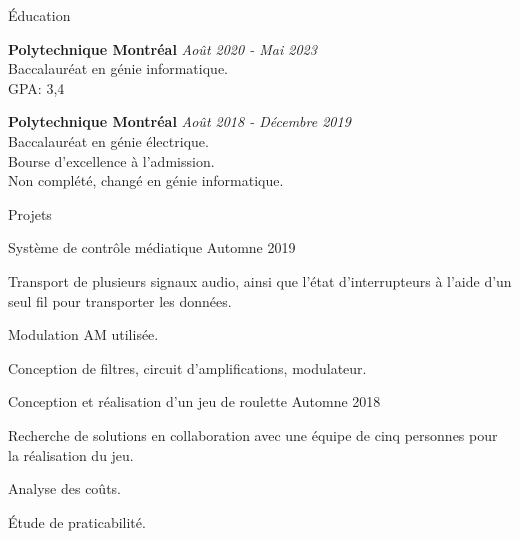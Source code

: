 \documentclass[french,12pt]{resume} %
\begin{document}
	

	\begin{rSection}{Éducation}
		
		{\bf Polytechnique Montréal} \hfill {\em Août 2020 - Mai 2023} 
		\\ Baccalauréat en génie informatique.
		\\  GPA: 3,4
		
		{\bf Polytechnique Montréal} \hfill {\em Août 2018 - Décembre 2019} 
		\\ Baccalauréat en génie électrique.
		\\   Bourse d'excellence à l'admission.
		\\		Non complété, changé en génie informatique.
	\end{rSection}
	
	\begin{rSection}{Projets}
		
		\begin{rSubsection}{Système de contrôle médiatique }{Automne 2019}{}{}
			\item   Transport de plusieurs signaux audio, ainsi que l'état d'interrupteurs à l'aide d'un seul fil pour transporter les données.
			\item   Modulation AM utilisée.
			\item Conception de filtres, circuit d'amplifications, modulateur.
			
		\end{rSubsection}
		
%			
		
		\begin{rSubsection}{Conception et réalisation d’un jeu de roulette }{Automne 2018}{}{}
			\item  Recherche de solutions en collaboration avec une équipe de cinq personnes pour la réalisation du jeu.
			\item  Analyse des coûts.
			\item  Étude de praticabilité.
		\end{rSubsection} 
		
	\end{rSection}
	
\end{document}
